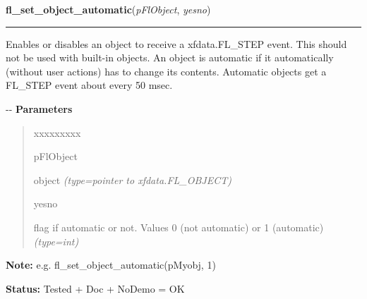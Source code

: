 \hspace{.8\funcindent}\begin{boxedminipage}{\funcwidth}

    \raggedright \textbf{fl\_set\_object\_automatic}(\textit{pFlObject}, \textit{yesno})

    \vspace{-1.5ex}

    \rule{\textwidth}{0.5\fboxrule}
\setlength{\parskip}{2ex}

Enables or disables an object to receive a xfdata.FL\_STEP event. This
should not be used with built-in objects. An object is automatic if it
automatically (without user actions) has to change its contents. Automatic
objects get a FL\_STEP event about every 50 msec.

-{}-
\setlength{\parskip}{1ex}
      \textbf{Parameters}
      \vspace{-1ex}

      \begin{quote}
        \begin{Ventry}{xxxxxxxxx}

          \item[pFlObject]


object
            {\it (type=pointer to xfdata.FL\_OBJECT)}

          \item[yesno]


flag if automatic or not. Values 0 (not automatic) or 1 (automatic)
            {\it (type=int)}

        \end{Ventry}

      \end{quote}

\textbf{Note:} 
e.g. fl\_set\_object\_automatic(pMyobj, 1)


\textbf{Status:} 
Tested + Doc + NoDemo = OK


    \end{boxedminipage}

    \label{xformslib:flbasic:fl_object_is_automatic}

    \vspace{0.5ex}

